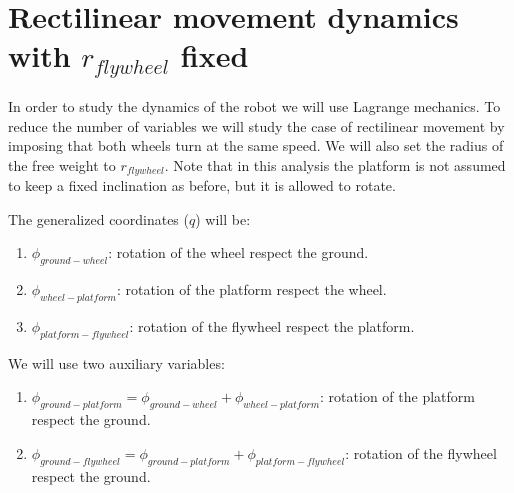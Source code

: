 \section{Rectilinear movement dynamics with $r_{flywheel}$ fixed}

In order to study the dynamics of the robot we will use Lagrange mechanics.
To reduce the number of variables we will study the case of rectilinear
movement by imposing that both wheels turn at the same speed. We will also set
the radius of the free weight to $r_{flywheel}$. Note that in this analysis the
platform is not assumed to keep a fixed inclination as before, but it is allowed to rotate.

The generalized coordinates ($q$) will be:
\begin{enumerate}
	\item $\phi_{ground-wheel}$: rotation of the wheel respect the ground.
	\item $\phi_{wheel-platform}$: rotation of the platform respect the wheel.
	\item $\phi_{platform-flywheel}$: rotation of the flywheel respect the platform.
\end{enumerate}

We will use two auxiliary variables:
\begin{enumerate}
	\item $\phi_{ground-platform}=\phi_{ground-wheel}+\phi_{wheel-platform}$: rotation of the platform respect the ground.
	\item $\phi_{ground-flywheel}=\phi_{ground-platform}+\phi_{platform-flywheel}$: rotation of the flywheel respect the ground.
\end{enumerate}

